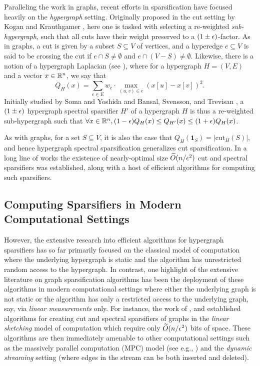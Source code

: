 \documentclass{article}
\begin{document}
Paralleling the work in graphs, recent efforts in sparsification have focused heavily on the \emph{hypergraph} setting. Originally proposed in the cut setting by Kogan and Krauthgamer \cite{KK15}, here one is tasked with selecting a re-weighted \emph{sub-hypergraph}, such that all cuts have their weight preserved to a $(1 \pm \epsilon)$-factor. As in graphs, a cut is given by a subset $S \subseteq V$ of vertices, and a hyperedge $e \subseteq V$ is said to be crossing the cut if $e \cap S \neq \emptyset$ and $e \cap (V-S) \neq \emptyset$. Likewise, there is a notion of a hypergraph Laplacian (see \cite{CLTZ18}),  where for a hypergraph $H = (V, E)$ and a vector $x \in \mathbb{R}^n$, we say that 
\[
Q_H(x) = \sum_{e \in E} w_e \cdot \max_{(u,v) \in e}(x[u] - x[v])^2.
\]
Initially studied by Soma and  Yoshida \cite{SomaY19} and Bansal, Svensson, and Trevisan \cite{BansalST19},
a $(1 \pm \epsilon)$ hypergraph spectral sparsifier $H'$ of a hypergraph $H$ is thus a re-weighted sub-hypergraph such that $\forall x \in \mathbb{R}^n, (1 - \epsilon)Q_H(x) \leq Q_{H'}(x) \leq (1 + \epsilon)Q_H(x)$.


As with graphs, for a set $S \subseteq V$, it is also the case that $Q_H(\mathbf{1}_S) = |\mathrm{cut}_H(S)|$, and hence hypergraph spectral sparsification generalizes cut sparsification. In a long line of works \cite{CKN20, KKTY21a, KKTY21b, Lee23, JambulapatiLS23, JLLS23, OST23, Qua23, KPS24} the existence of nearly-optimal size $\widetilde{O}(n / \epsilon^2)$ cut and spectral sparsifiers was established, along with a host of efficient algorithms for computing such sparsifiers.

\subsection{Computing Sparsifiers in Modern Computational Settings}

However, the extensive research into efficient algorithms for hypergraph sparsifiers has so far primarily focused on the classical model of computation where the underlying hypergraph is static and the algorithm has unrestricted random access to the hypergraph. In contrast, one highlight of the extensive literature on graph sparsification algorithms has been the deployment of these algorithms in modern computational settings where either the underlying graph is not static or the algorithm has only a restricted access to the underlying graph, say, via {\em linear measurements} only.
For instance, the work of \cite{AGM12}, and \cite{KLMMS14} established algorithms for creating cut and spectral sparsifiers of graphs in the \emph{linear sketching} model of computation which require only $\widetilde{O}(n / \epsilon^2)$ bits of space. These algorithms are then immediately amenable to other computational settings such as the massively parallel computation (MPC) model (see e.g., \cite{AssadiCLMW22,AgarwalKLP22}) and the \emph{dynamic streaming} setting (where edges in the stream can be both inserted and deleted).
\end{document}
